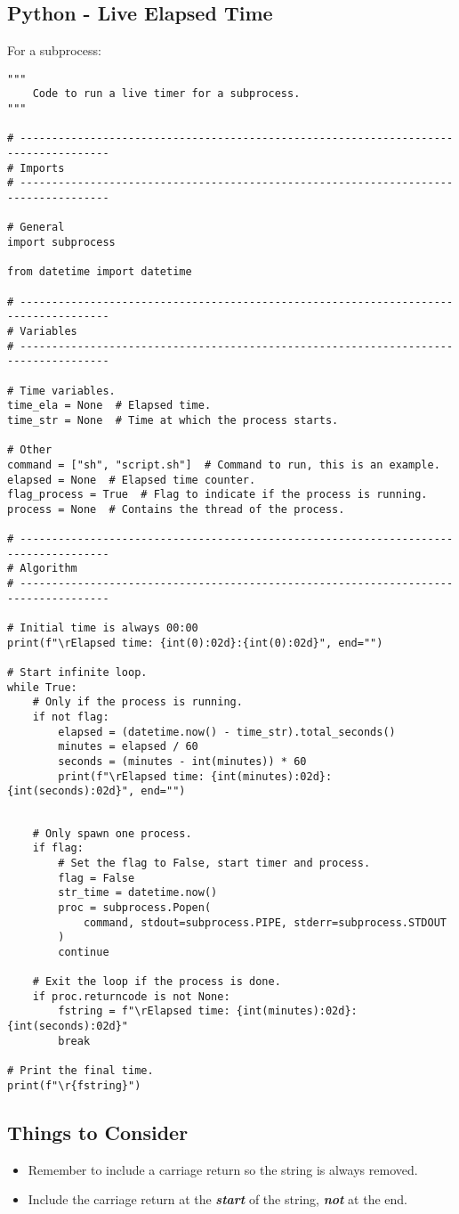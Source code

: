 \subsection{Python - Live Elapsed Time}

For a subprocess:
\begin{verbatim}
"""
    Code to run a live timer for a subprocess.
"""

# ------------------------------------------------------------------------------------
# Imports
# ------------------------------------------------------------------------------------

# General
import subprocess

from datetime import datetime

# ------------------------------------------------------------------------------------
# Variables
# ------------------------------------------------------------------------------------

# Time variables.
time_ela = None  # Elapsed time.
time_str = None  # Time at which the process starts.

# Other
command = ["sh", "script.sh"]  # Command to run, this is an example.
elapsed = None  # Elapsed time counter.
flag_process = True  # Flag to indicate if the process is running.
process = None  # Contains the thread of the process.

# ------------------------------------------------------------------------------------
# Algorithm
# ------------------------------------------------------------------------------------

# Initial time is always 00:00
print(f"\rElapsed time: {int(0):02d}:{int(0):02d}", end="")

# Start infinite loop.
while True:
    # Only if the process is running.
    if not flag:
        elapsed = (datetime.now() - time_str).total_seconds()
        minutes = elapsed / 60
        seconds = (minutes - int(minutes)) * 60
        print(f"\rElapsed time: {int(minutes):02d}:{int(seconds):02d}", end="")

\end{verbatim}
\newpage
\begin{verbatim}

    # Only spawn one process.
    if flag:
        # Set the flag to False, start timer and process.
        flag = False
        str_time = datetime.now()
        proc = subprocess.Popen(
            command, stdout=subprocess.PIPE, stderr=subprocess.STDOUT
        )
        continue
    
    # Exit the loop if the process is done.
    if proc.returncode is not None:
        fstring = f"\rElapsed time: {int(minutes):02d}:{int(seconds):02d}"
        break

# Print the final time.
print(f"\r{fstring}")

\end{verbatim}
\subsection*{Things to Consider}
\begin{itemize}
    \item Remember to include a carriage return so the string is always removed.
    \item Include the carriage return at the \textbf{\textit{start}} of the string,
          \textbf{\textit{not}} at the end.
\end{itemize}
